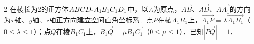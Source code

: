 \documentclass[fontset=none]{ctexart}
\begin{document}
\begin{multicols}{2}
 在棱长为\(2\)的正方体\(ABCD\text{-}\penalty100 A_1B_1C_1D_1\)中，以\(A\)为原点，\(\overrightarrow{AB}\)、\(\overrightarrow{AD}\)、\(\overrightarrow{AA_1}\)的方向为\(x\)轴、\(y\)轴、\(z\)轴正方向建立空间直角坐标系．点\(P\)在棱\(A_1B_1\)上，\(\overrightarrow{A_1P}=\lambda\overrightarrow{A_1B_1}\)（\(0\leq\lambda\leq1\)）；点\(Q\)在棱\(B_1C_1\)上，\(\overrightarrow{B_1Q}=\mu\overrightarrow{B_1C_1}\)（\(0\leq\mu\leq1\)）．已知\(|\overrightarrow{PQ}|=1\)．
\xiexwei{16mm}
\begin{ansblock}[练-课时05-16]
\setlength{\anshang}{7.6mm}%
\end{ansblock}

\end{multicols}

\tailfill
\end{document}
